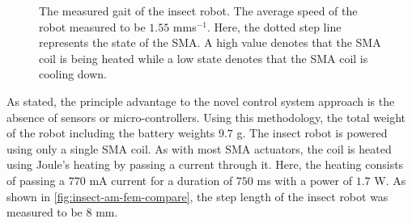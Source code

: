 \begin{figure}[hbt!] %
  \centering
  \resizebox{0.75\columnwidth}{!}{}
  \caption[The measured gait of the insect robot]{The measured gait of the insect robot. The average speed of the robot measured to be $1.55$ mms$^{-1}$. Here, the dotted step line represents the state of the SMA. A high value denotes that the SMA coil is being heated while a low state denotes that the SMA coil is cooling down.}
  \label{fig:insect-disp}
\end{figure}

As stated, the principle advantage to the novel control system approach is the absence of sensors or micro-controllers. Using this methodology, the total weight of the robot including the battery weights $9.7$ g. The insect robot is powered using only a single SMA coil. As with most SMA actuators, the coil is heated using Joule's heating by passing a current through it. Here, the heating consists of passing a $770$ mA current for a duration of $750$ ms with a power of $1.7$ W. As shown in \cref{fig:insect-am-fem-compare}, the step length of the insect robot was measured to be $8$ mm.

